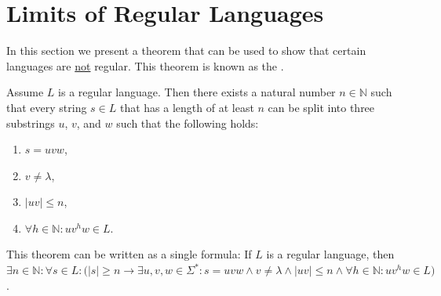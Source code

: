 \section{Limits of Regular Languages}
In this section we present a theorem that can be used to show that certain languages are
\underline{not} regular.  This theorem is known as the 
\href{https://en.wikipedia.org/wiki/Pumping_lemma_for_regular_languages}{}.

\begin{Theorem} \lb
   
  Assume $L$ is a regular language.  Then there exists a natural number $n \in \mathbb{N}$ such that
  every string $s \in L$ that has a length of at least $n$ can be split into three substrings $u$,
  $v$, and $w$ such that the following holds:
  \begin{enumerate}
  \item $s= uvw$,
  \item $v \not= \lambda$,
  \item $|uv| \leq n$,
  \item $\forall h \in \mathbb{N}: uv^hw \in L$.
  \end{enumerate}
  This theorem can be written as a single formula:  If $L$ is a regular language, then 
  \\[0.2cm]
  \hspace*{1.3cm}
  $\exists n \in \mathbb{N}:\forall s \in L : \bigl(|s| \geq n \rightarrow \exists u,v,w\in \Sigma^* :
   s = uvw \wedge v \not= \lambda \wedge |uv| \leq n \wedge 
    \forall h \in \mathbb{N}: uv^h w \in L
   \bigr)
  $.
\end{Theorem}

